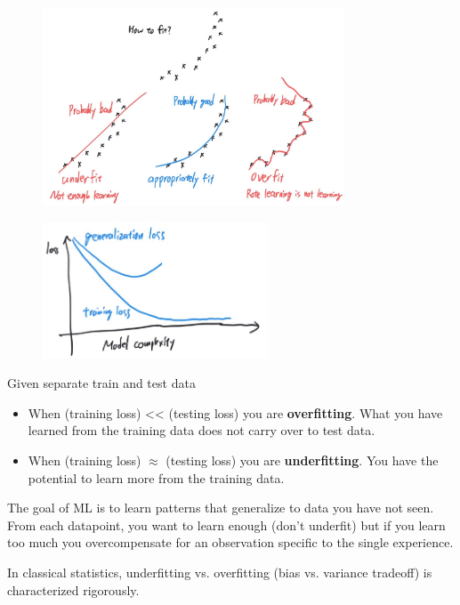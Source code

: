 \documentclass{report}
\begin{document}
\begin{definition}
    \begin{figure}[H]
        \centering
        \includegraphics[width=0.8\textwidth]{.././assets/6.2.jpg}
    \end{figure}

    \begin{figure}[H]
        \centering
        \includegraphics[width=0.6\textwidth]{.././assets/6.3.png}
    \end{figure}

    Given separate train and test data

    \begin{itemize}
        \item When (training loss) << (testing loss) you are \textbf{overfitting}. What you have learned from the training data does not carry over to test data.
        \item When (training loss) $\approx$ (testing loss) you are \textbf{underfitting}. You have the potential to learn more from the training data.
    \end{itemize}

    \par\noindent\textcolor{gray}{\hdashrule{\textwidth}{0.4pt}{1pt 2pt}}

    The goal of ML is to learn patterns that generalize to data you have not seen. From each datapoint, you want to learn enough (don't underfit) but if you learn too much you overcompensate for an observation specific to the single experience.

    In classical statistics, underfitting vs. overfitting (bias vs. variance tradeoff) is characterized rigorously.
\end{definition}
\end{document}
